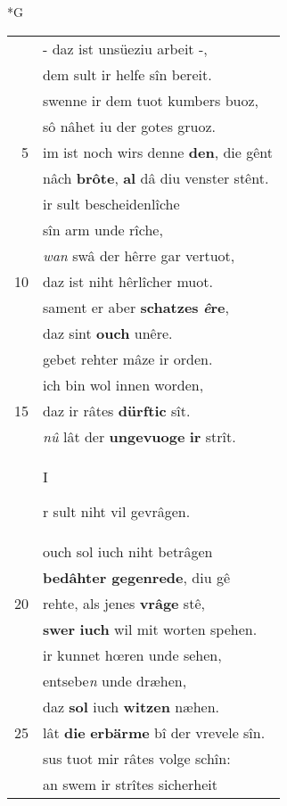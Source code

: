 \documentclass[8pt,a4paper,notitlepage]{article}
\begin{document}
\begin{table}[ht]
\begin{minipage}[t]{0.5\linewidth}
\small
\begin{center}*G
\end{center}
\begin{tabular}{rl}
 & - daz ist unsüeziu arbeit -,\\ 
 & dem sult ir helfe sîn bereit.\\ 
 & swenne ir dem tuot kumbers buoz,\\ 
 & sô nâhet iu der gotes gruoz.\\ 
5 & im ist noch wirs denne \textbf{den}, die gênt\\ 
 & nâch \textbf{brôte}, \textbf{al} dâ diu venster stênt.\\ 
 & ir sult bescheidenlîche\\ 
 & sîn arm unde rîche,\\ 
 & \textit{wan} swâ der hêrre gar vertuot,\\ 
10 & daz ist niht hêrlîcher muot.\\ 
 & sament er aber \textbf{schatzes} \textbf{\textit{ê}re},\\ 
 & daz sint \textbf{ouch} unêre.\\ 
 & gebet rehter mâze ir orden.\\ 
 & ich bin wol innen worden,\\ 
15 & daz ir râtes \textbf{dürftic} sît.\\ 
 & \textit{nû} lât der \textbf{ungevuoge} \textbf{ir} strît.\\ 
 & \begin{large}I\end{large}r sult niht vil gevrâgen.\\ 
 & ouch sol iuch niht betrâgen\\ 
 & \textbf{bedâhter gegenrede}, diu gê\\ 
20 & rehte, als jenes \textbf{vrâge} stê,\\ 
 & \textbf{swer} \textbf{iuch} wil mit worten spehen.\\ 
 & ir kunnet hœren unde sehen,\\ 
 & entsebe\textit{n} unde dræhen,\\ 
 & daz \textbf{sol} iuch \textbf{witzen} næhen.\\ 
25 & lât \textbf{die} \textbf{erbärme} bî der vrevele sîn.\\ 
 & sus tuot mir râtes volge schîn:\\ 
 & an swem ir strîtes sicherheit\\ 

\end{tabular}
\end{minipage}
\end{table}
\end{document}
